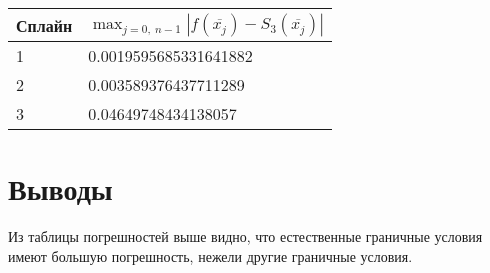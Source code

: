 \documentclass[12pt, a4paper]{article}
\begin{document}
	
	
	\begin{table}[H]
		\centering
		\begin{tabular}{|l|l|}
			\hline
			Сплайн	& $\max_{j=0,\ n-1}|f(\overline{x_j}) - S_3(\overline{x_j})|$ \\ \hline
			1   	&     0.0019595685331641882	\\ \hline
			2   	&     0.003589376437711289		\\ \hline
			3   	&     0.04649748434138057		\\ \hline
		\end{tabular}
	\end{table}
	
	\section{Выводы}
	
	Из таблицы погрешностей выше видно, что естественные граничные условия имеют большую погрешность, нежели другие граничные условия.
	
\end{document}
